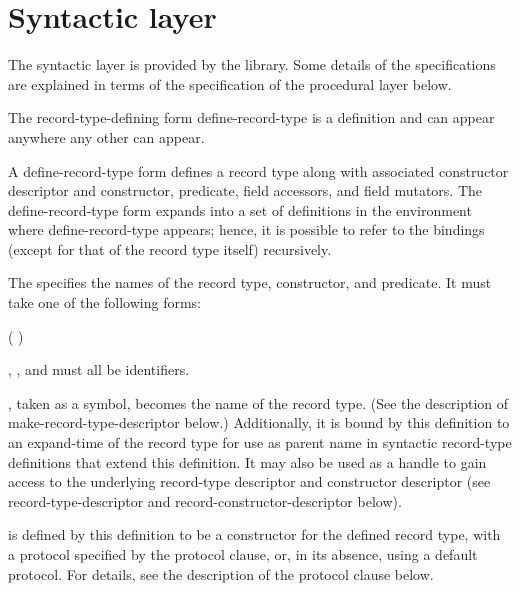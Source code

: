 \section{Syntactic layer}
\label{recordssyntacticsection}

The syntactic layer is provided by the  library.  Some details of the specifications are
explained in terms of the specification of the procedural layer below.

The record-type-defining form {\cf define-record-type} is a definition and
can appear anywhere any other  can appear.

\begin{entry}{%
}

A {\cf define-record-type} form defines a record type along with
associated constructor descriptor and constructor, predicate, field
accessors, and field mutators. The {\cf define-record-type} form expands into
a set of definitions in the environment where {\cf define-record-type}
appears; hence, it is possible to refer to the bindings (except for
that of the record type itself) recursively.

The  specifies the names of the record type,
constructor, and predicate. It must take one of the following
forms:

\begin{scheme}
(  )
\end{scheme}

, , and  must all be identifiers.

, taken as a symbol, becomes the name of the record
type. (See the description of {\cf make-record-type-descriptor}
below.)
Additionally, it is bound by this definition to an expand-time
of the record type for use as parent name in
syntactic record-type definitions that extend this definition. It may
also be used as a handle to gain access to the underlying record-type
descriptor and constructor descriptor (see {\cf
  record-type-descriptor} and {\cf record-constructor-descriptor}
below).

 is defined by this definition to be a
constructor for the defined record type, with a protocol specified by
the {\cf protocol} clause, or, in its absence, using a default protocol. For
details, see the description of the {\cf protocol} clause below.


\end{entry}

